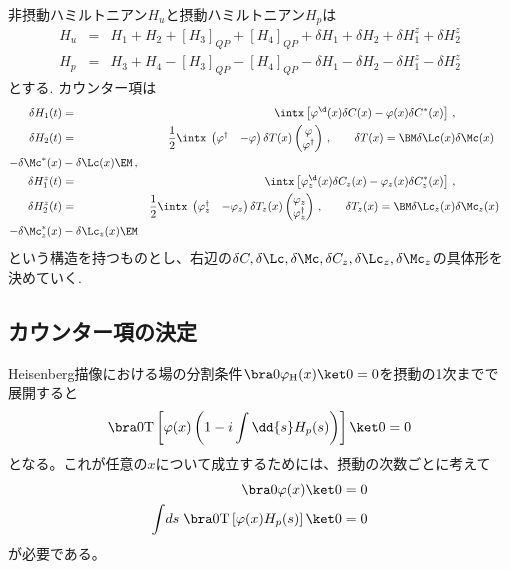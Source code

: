 \documentclass[10.5pt,a4paper]{jreport}
\begin{document}
非摂動ハミルトニアン$H_u$と摂動ハミルトニアン$H_p$は
\begin{eqnarray}
  H_u &=& H_1 + H_2 + [H_3]_{QP} +[H_4]_{QP}+ \delta H_1 + \delta H_2+ \delta H_1^{z}+ \delta H_2^{z} \\
  H_p &=& H_3 + H_4 - [H_3]_{QP} -[H_4]_{QP}- \delta H_1 - \delta H_2- \delta H_1^{z}- \delta H_2^{z}
\end{eqnarray}
とする. カウンター項は
\begin{eqnarray}
  \delta H_1(t) &=& \intx \left[ \varphi^\d(x) \delta C(x) - \varphi(x) \delta C^*(x) \right] \,,\\
  \delta H_2(t) &=& \frac12\intx\; \begin{pmatrix}
    \varphi^\dagger & -\varphi
  \end{pmatrix}
  \delta T(x)
  \begin{pmatrix}
    \varphi\\
    \varphi^\dagger
  \end{pmatrix} \,,\qquad
  \delta T(x) = \BM \delta\Lc(x) & \delta\Mc(x) \\ -\delta\Mc^*(x) & -\delta\Lc(x) \EM \,,\\
  \delta H_1^{z}(t) &=& \intx \left[ \varphi^\d_{z}(x) \delta C_{z}(x) - \varphi_{z}(x) \delta C_{z}^*(x) \right] \,,\\
  \delta H_2^{z}(t) &=& \frac12\intx\; \begin{pmatrix}
    \varphi_z^\dagger & -\varphi_z
  \end{pmatrix}
  \delta T_z(x)
  \begin{pmatrix}
    \varphi_z\\
    \varphi_z^\dagger
  \end{pmatrix} \,,\qquad 
  \delta T_{z}(x) = \BM \delta\Lc_{z}(x) & \delta\Mc_{z}(x) \\ -\delta\Mc_{z}^*(x) & -\delta\Lc_{z}(x) \EM 
\end{eqnarray}
という構造を持つものとし、右辺の$\delta C, \delta\Lc, \delta\Mc, \delta C_{z}, \delta\Lc_{z}, \delta\Mc_{z}$の具体形を決めていく.

\subsection{カウンター項の決定}
Heisenberg描像における場の分割条件$\bra0 \varphi_{\rm H}(x) \ket0=0$を摂動の1次までで展開すると
\begin{equation}
  \bra0 \mathrm{T} \left[ \varphi(x) \left( 1 - i \int \dd{s} H_p(s) \right)\right] \ket0 = 0
\end{equation}
となる。これが任意の$x$について成立するためには、摂動の次数ごとに考えて
\begin{align}
  \bra0 \varphi(x) \ket0 &= 0 \label{z:divCond1}\\
  \int\!ds \;\bra0  \mathrm{T} \left[ \varphi(x)  H_p(s) \right] \ket0 &= 0\label{z:divCond2}
\end{align}
が必要である。
\end{document}
